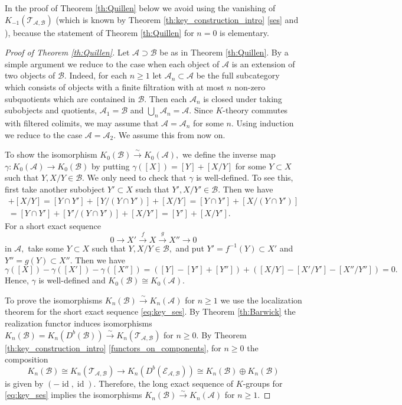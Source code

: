 \documentclass[11pt,leqno]{amsart}
\numberwithin{equation}{section}
\newcommand{\xto}{\xrightarrow}
\newcommand{\cA}{{\mathcal A}}
\newcommand{\cB}{{\mathcal B}}
\newcommand{\cE}{{\mathcal E}}
\newcommand{\cT}{{\mathcal T}}
\newcommand{\id}{\operatorname{id}}
\begin{document}
In the proof of Theorem \ref{th:Quillen} below we avoid using the vanishing of $K_{-1}(\cT_{\cA,\cB})$ (which is known by Theorem \ref{th:key_construction_intro} \ref{ses} and \cite[Theorem 2.35]{AGH19}), because the statement of Theorem \ref{th:Quillen} for $n=0$ is elementary.

\begin{proof}[Proof of Theorem \ref{th:Quillen}] Let $\cA\supset\cB$ be as in Theorem \ref{th:Quillen}. By a simple argument we reduce to the case when each object of $\cA$ is an extension of two objects of $\cB.$ Indeed, for each $n\geq 1$ let $\cA_n\subset\cA$ be the full subcategory which consists of objects with a finite filtration with at most $n$ non-zero subquotients which are contained in $\cB.$ Then each $\cA_n$ is closed under taking subobjects and quotients, $\cA_1=\cB$ and $\bigcup\limits_{n}\cA_n=\cA.$ Since $K$-theory commutes with filtered colimits, we may assume that $\cA=\cA_n$ for some $n.$ Using induction we reduce to the case $\cA=\cA_2.$ We assume this from now on.

To show the isomorphism $K_0(\cB)\xto{\sim} K_0(\cA),$ we define the inverse map $\gamma:K_0(\cA)\to K_0(\cB)$ by putting $\gamma([X])=[Y]+[X/Y]$ for some $Y\subset X$ such that $Y,X/Y\in \cB.$ We only need to check that $\gamma$ is well-defined. To see this, first take another subobject $Y'\subset X$ such that $Y',X/Y'\in\cB.$ Then we have
\begin{multline*}
[Y]+[X/Y]=[Y\cap Y']+[Y/(Y\cap Y')]+[X/Y]=[Y\cap Y']+[X/(Y\cap Y')]\\
=[Y\cap Y']+[Y'/(Y\cap Y')]+[X/Y']=[Y']+[X/Y'].
\end{multline*} 
For a short exact sequence 
\begin{equation*}
0\to X'\xto{f} X\xto{g} X''\to 0
\end{equation*}
in $\cA,$ take some $Y\subset X$ such that $Y,X/Y\in\cB,$ and put $Y'=f^{-1}(Y)\subset X'$ and $Y''=g(Y)\subset X''.$ Then we have
\begin{equation*}
\gamma([X])-\gamma([X'])-\gamma([X''])=([Y]-[Y']+[Y''])+([X/Y]-[X'/Y']-[X''/Y''])=0.
\end{equation*}
Hence, $\gamma$ is well-defined and $K_0(\cB)\cong K_0(\cA).$

To prove the isomorphisms $K_n(\cB)\xto{\sim}K_n(\cA)$ for $n\geq 1$ we use the localization theorem for the short exact sequence \eqref{eq:key_ses}. By Theorem \ref{th:Barwick} the realization functor induces isomorphisms $K_n(\cB)=K_n(D^b(\cB))\xto{\sim} K_n(\cT_{\cA,\cB})$ for $n\geq 0.$ By Theorem \ref{th:key_construction_intro} \ref{functors_on_components}, for $n\geq 0$ the composition
\begin{equation*}
K_n(\cB)\cong K_n(\cT_{\cA,\cB})\to K_n(D^b(\cE_{\cA,\cB}))\cong K_n(\cB)\oplus K_n(\cB)
\end{equation*}
is given by $(-\id,\id).$ Therefore, the long exact sequence of $K$-groups for \eqref{eq:key_ses} implies the isomorphisms $K_n(\cB)\xto{\sim} K_n(\cA)$ for $n\geq 1.$
\end{proof}
\end{document}

